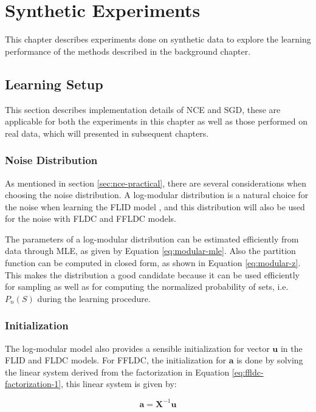 \chapter{Synthetic Experiments}
\label{sec:synthetic}

This chapter describes experiments done on synthetic data to explore the learning performance of the methods described in the background chapter.

\section{Learning Setup}

This section describes implementation details of NCE and SGD, these are applicable for both the experiments in this chapter as well as those performed on real data, which will presented in subsequent chapters.

\subsection{Noise Distribution}

As mentioned in section \ref{sec:nce-practical}, there are several considerations when choosing the noise distribution. A log-modular distribution is a natural choice for the noise when learning the FLID model \citep{tschiatschek16learning}, and this distribution will also be used for the noise with FLDC and FFLDC models.

The parameters of a log-modular distribution can be estimated efficiently from data through MLE, as given by Equation \eqref{eq:modular-mle}. Also the partition function can be computed in closed form, as shown in Equation \eqref{eq:modular-z}. This makes the distribution a good candidate because it can be used efficiently for sampling as well as for computing the normalized probability of sets, i.e. $P_{n}(S)$ during the learning procedure.

\subsection{Initialization}

The log-modular model also provides a sensible initialization for vector $\mathbf{u}$ in the FLID and FLDC models. For FFLDC, the initialization for $\mathbf{a}$ is done by solving the linear system derived from the factorization in Equation \eqref{eq:ffldc-factorization-1}, this linear system is given by:

\begin{equation}
  \label{eq:modular_features}
  \mathbf{a} = \mathbf{X}^{-1}\mathbf{u}
\end{equation}

